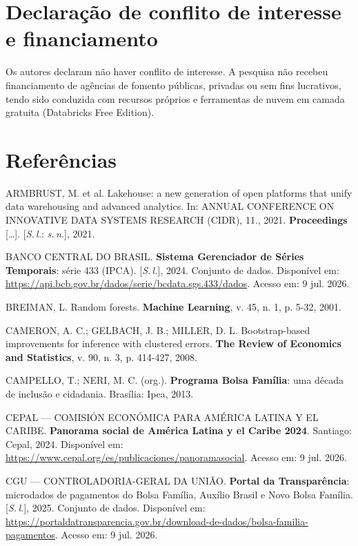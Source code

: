 \documentclass[12pt,a4paper,oneside]{article}
\begin{document}
\vspace{6pt}
\section*{Declaração de conflito de interesse e financiamento}
\noindent Os autores declaram não haver conflito de interesse. A pesquisa não recebeu financiamento de agências de fomento públicas, privadas ou sem fins lucrativos, tendo sido conduzida com recursos próprios e ferramentas de nuvem em camada gratuita (Databricks Free Edition).

\vspace{6pt}
\section*{Referências}
\begin{singlespace}\small
\newcommand{\refitem}{\par\smallskip\noindent\hangindent=1.25cm\relax}

\refitem ARMBRUST, M. et al. Lakehouse: a new generation of open platforms that unify data warehousing and advanced analytics. In: ANNUAL CONFERENCE ON INNOVATIVE DATA SYSTEMS RESEARCH (CIDR), 11., 2021. \textbf{Proceedings} [\ldots]. [\textit{S.\,l.}: \textit{s.\,n.}], 2021.

\refitem BANCO CENTRAL DO BRASIL. \textbf{Sistema Gerenciador de Séries Temporais}: série 433 (IPCA). [\textit{S.\,l.}], 2024. Conjunto de dados. Disponível em: \url{https://api.bcb.gov.br/dados/serie/bcdata.sgs.433/dados}. Acesso em: 9 jul. 2026.

\refitem BREIMAN, L. Random forests. \textbf{Machine Learning}, v. 45, n. 1, p. 5-32, 2001.

\refitem CAMERON, A. C.; GELBACH, J. B.; MILLER, D. L. Bootstrap-based improvements for inference with clustered errors. \textbf{The Review of Economics and Statistics}, v. 90, n. 3, p. 414-427, 2008.

\refitem CAMPELLO, T.; NERI, M. C. (org.). \textbf{Programa Bolsa Família}: uma década de inclusão e cidadania. Brasília: Ipea, 2013.

\refitem CEPAL --- COMISIÓN ECONÓMICA PARA AMÉRICA LATINA Y EL CARIBE. \textbf{Panorama social de América Latina y el Caribe 2024}. Santiago: Cepal, 2024. Disponível em: \url{https://www.cepal.org/es/publicaciones/panoramasocial}. Acesso em: 9 jul. 2026.

\refitem CGU --- CONTROLADORIA-GERAL DA UNIÃO. \textbf{Portal da Transparência}: microdados de pagamentos do Bolsa Família, Auxílio Brasil e Novo Bolsa Família. [\textit{S.\,l.}], 2025. Conjunto de dados. Disponível em: \url{https://portaldatransparencia.gov.br/download-de-dados/bolsa-familia-pagamentos}. Acesso em: 9 jul. 2026.


\end{singlespace}
\end{document}
